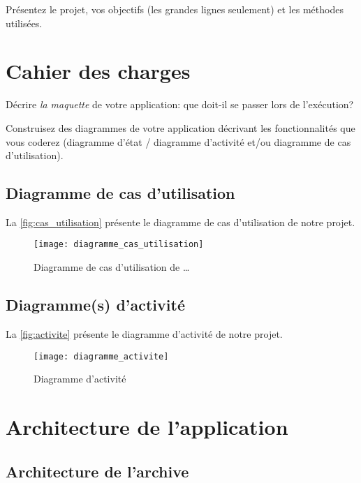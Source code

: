 \documentclass[11pt,a4paper]{article}
\begin{document}
Présentez le projet, vos objectifs (les grandes lignes seulement) et les méthodes utilisées.


\section{Cahier des charges}

Décrire \emph{la maquette} de votre application: que doit-il se passer lors de l'exécution?

Construisez des diagrammes de votre application décrivant les fonctionnalités que vous coderez (diagramme d'état / diagramme d'activité et/ou diagramme de cas d'utilisation).

\subsection{Diagramme de cas d'utilisation}

La \autoref{fig:cas_utilisation} présente le diagramme de cas d'utilisation de notre projet.

\begin{figure}[tb]
  \centering
  \texttt{[image: diagramme\_cas\_utilisation]}
  \caption{Diagramme de cas d'utilisation de \dots}
  \label{fig:cas_utilisation}
\end{figure}

\subsection{Diagramme(s) d'activité}

La \autoref{fig:activite} présente le diagramme d'activité de notre projet.

\begin{figure}[tb]
  \centering
  \texttt{[image: diagramme\_activite]}
  \caption{Diagramme d'activité}
  \label{fig:activite}
\end{figure}

\section{Architecture de l'application}

\subsection{Architecture de l'archive}
\end{document}

